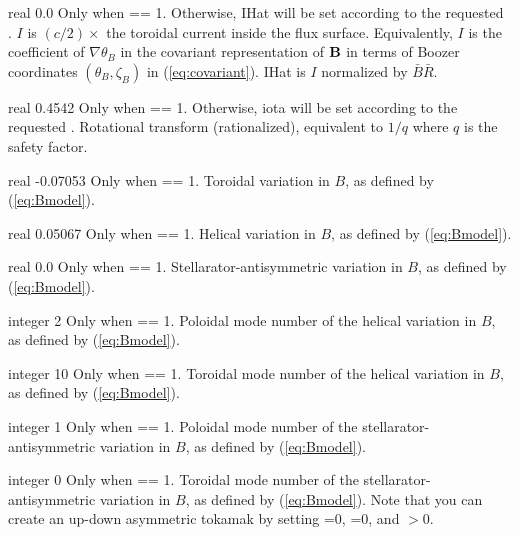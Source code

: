 \myhrule

{real}
{0.0}
{Only when  == 1. Otherwise, {\ttfamily IHat} will be set according to the requested .}
{$I$ is $(c/2)\times$ the toroidal current inside the flux
 surface. Equivalently, $I$ is the coefficient of $\nabla\theta_B$ in the
 covariant representation of ${\mathbf B}$ in terms of Boozer coordinates $(\theta_B,\zeta_B)$ in (\ref{eq:covariant}).
{\ttfamily IHat} is $I$ normalized by $\bar{B}\bar{R}$.}

\myhrule

{real}
{0.4542}
{Only when  == 1. Otherwise, {\ttfamily iota} will be set according to the requested .}
{Rotational transform (rationalized), equivalent to $1/q$ where $q$ is the safety factor.}

\myhrule

{real}
{-0.07053}
{Only when  == 1.}
{Toroidal variation in $B$, as defined by (\ref{eq:Bmodel}).}

\myhrule

{real}
{0.05067}
{Only when  == 1.}
{Helical variation in $B$, as defined by (\ref{eq:Bmodel}).}

\myhrule

{real}
{0.0}
{Only when  == 1.}
{Stellarator-antisymmetric variation in $B$, as defined by (\ref{eq:Bmodel}).}

\myhrule

{integer}
{2}
{Only when  == 1.}
{Poloidal mode number of the helical variation in $B$, as defined by (\ref{eq:Bmodel}).}

\myhrule

{integer}
{10}
{Only when  == 1.}
{Toroidal mode number of the helical variation in $B$, as defined by (\ref{eq:Bmodel}).}

\myhrule

{integer}
{1}
{Only when  == 1.}
{Poloidal mode number of the stellarator-antisymmetric variation in $B$, as defined by (\ref{eq:Bmodel}).}

\myhrule

{integer}
{0}
{Only when  == 1.}
{Toroidal mode number of the stellarator-antisymmetric variation in $B$, as defined by (\ref{eq:Bmodel}).
Note that you can create an up-down asymmetric tokamak by setting =0, =0,
and $>$0.}

